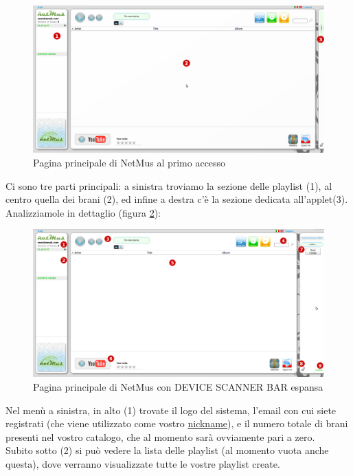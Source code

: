 \begin{figure}[!htbp]
  \centering
  \includegraphics[width=14cm]{img/MU/profile_blank.png}
\caption{Pagina principale di NetMus al primo accesso}
\label{fig:paginaPrincipale}
\end{figure}

Ci sono tre parti principali: a sinistra troviamo la sezione delle
playlist (1), al centro quella dei brani (2), ed infine a destra c'\`e la
sezione dedicata all'applet(3).\\

Analizziamole in dettaglio (figura \ref{fig:appletbarAperta}):\\
\begin{figure}[!htbp]
  \centering
  \includegraphics[width=14cm]{img/MU/applet_bar_open.png}
\caption{Pagina principale di NetMus con DEVICE SCANNER BAR espansa}
\label{fig:appletbarAperta}
\end{figure} 

Nel men\`u a sinistra, in alto (1) trovate il logo del sistema,
l'email con cui siete registrati (che viene utilizzato come vostro
\underline{nickname}), e il numero totale di brani presenti nel vostro catalogo,
che al momento sar\`a ovviamente pari a zero.\\
Subito sotto (2) si pu\`o vedere la lista delle playlist (al momento vuota
anche questa), dove verranno visualizzate tutte le vostre playlist create.\\


